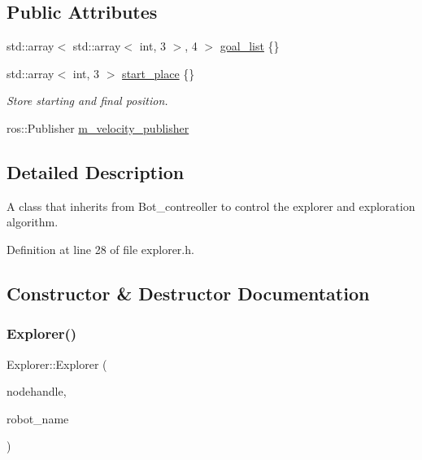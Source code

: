 \subsection*{Public Attributes}
\begin{DoxyCompactItemize}
\item 
std\+::array$<$ std\+::array$<$ int, 3 $>$, 4 $>$ \hyperlink{class_explorer_acda1856f421dfe836f39de446415b969}{goal\+\_\+list} \{\}
\item 
std\+::array$<$ int, 3 $>$ \hyperlink{class_explorer_af1aee46522a58db39d3643f2138c76fa}{start\+\_\+place} \{\}
\begin{DoxyCompactList}\small\item\em Store starting and final position. \end{DoxyCompactList}\item 
ros\+::\+Publisher \hyperlink{class_explorer_aee857cd646f2ce6eb7e017a67e90bcdf}{m\+\_\+velocity\+\_\+publisher}
\end{DoxyCompactItemize}


\subsection{Detailed Description}
A class that inherits from Bot\+\_\+contreoller to control the explorer and exploration algorithm. 

Definition at line 28 of file explorer.\+h.



\subsection{Constructor \& Destructor Documentation}
\mbox{\label{class_explorer_aafe6b7c3b9c2e24815aa14a731f31890}} 
\subsubsection{\texorpdfstring{Explorer()}{Explorer()}}
{\footnotesize\ttfamily Explorer\+::\+Explorer (\begin{DoxyParamCaption}\item[{ros\+::\+Node\+Handle $\ast$}]{nodehandle,  }\item[{const std\+::string \&}]{robot\+\_\+name }\end{DoxyParamCaption})}



